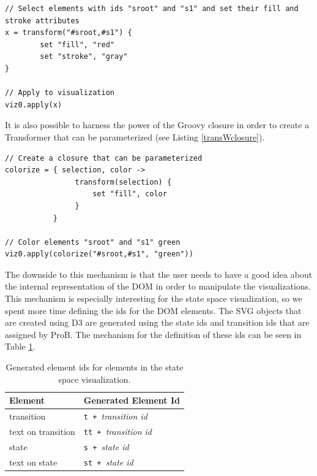 \lstset{language=java}
\begin{lstlisting}[caption=Create and apply a \texttt{Transformer} in the Groovy REPL,label=transformer]
// Select elements with ids "sroot" and "s1" and set their fill and stroke attributes
x = transform("#sroot,#s1") {
        set "fill", "red"
        set "stroke", "gray"
}

// Apply to visualization
viz0.apply(x)
\end{lstlisting}

It is also possible to harness the power of the Groovy closure in order to create a Transformer that can be parameterized (see Listing \ref{transWclosure}).

\begin{lstlisting}[caption=Use Groovy closures to generate \texttt{Transformers},label=transWclosure]
// Create a closure that can be parameterized
colorize = { selection, color ->
                transform(selection) {
                    set "fill", color
                }    
           }

// Color elements "sroot" and "s1" green
viz0.apply(colorize("#sroot,#s1", "green"))
\end{lstlisting}

The downside to this mechanism is that the user needs to have a good idea about the internal representation of the DOM in order to manipulate the visualizations. This mechanism is especially interesting for the state space visualization, so we spent more time defining the ids for the DOM elements. The SVG objects that are created using D3 are generated using the state ids and transition ids that are assigned by ProB. The mechanism for the definition of these ids can be seen in Table \ref{tab:elements}.

\begin{table}[h!]
\caption{Generated element ids for elements in the state space visualization.}
\label{tab:elements}
\begin{center}
\begin{tabular}{ | l | l | }
\hline
\textbf{Element} & \textbf{Generated Element Id} \\ \hline \hline
transition & \texttt{t + }\emph{transition id} \\ \hline
text on transition & \texttt{tt + }\emph{transition id} \\ \hline
state & \texttt{s + }\emph{state id} \\ \hline
text on state & \texttt{st + }\emph{state id} \\ \hline
\end{tabular}
\end{center}
\end{table}

